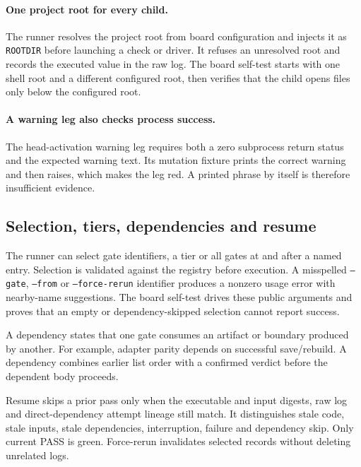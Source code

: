 \documentclass[10pt,aps,prd,twocolumn,nofootinbib]{revtex4-2}
\newcommand{\code}[1]{\texttt{#1}}
\begin{document}
\paragraph{One project root for every child.}
The runner resolves the project root from board configuration and injects it
as \code{ROOTDIR} before launching a check or driver.  It refuses an unresolved
root and records the executed value in the raw log.  The board self-test starts
with one shell root and a different configured root, then verifies that the
child opens files only below the configured root.

\paragraph{A warning leg also checks process success.}
The head-activation warning leg requires both a zero subprocess return status
and the expected warning text.  Its mutation fixture prints the correct
warning and then raises, which makes the leg red.  A printed phrase by itself
is therefore insufficient evidence.

\subsection{Selection, tiers, dependencies and resume}

The runner can select gate identifiers, a tier or all gates at and after a
named entry.  Selection is validated against the registry before execution.
A misspelled \code{--gate}, \code{--from} or \code{--force-rerun}
identifier produces a nonzero usage error with nearby-name suggestions.  The
board self-test drives these public arguments and proves that an empty or
dependency-skipped selection cannot report success.

A dependency states that one gate consumes an artifact or boundary produced
by another.  For example, adapter parity depends on successful save/rebuild.
A dependency combines earlier list order with a confirmed verdict before the
dependent body proceeds.

Resume skips a prior pass only when the executable and input digests, raw log
and direct-dependency attempt lineage still match.  It distinguishes stale
code, stale inputs, stale dependencies, interruption, failure and dependency
skip.  Only current PASS is green.  Force-rerun invalidates selected records
without deleting unrelated logs.
\end{document}
